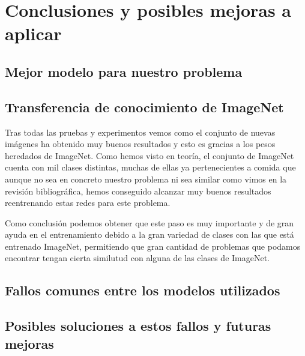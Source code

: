 \section{Conclusiones y posibles mejoras a aplicar}

\subsection{Mejor modelo para nuestro problema}


\subsection{Transferencia de conocimiento de ImageNet}

Tras todas las pruebas y experimentos vemos como el conjunto de nuevas imágenes ha obtenido muy buenos resultados y esto es gracias a los pesos heredados de ImageNet. Como hemos visto en teoría, el conjunto de ImageNet cuenta con mil clases distintas, muchas de ellas ya pertenecientes a comida que aunque no sea en concreto nuestro problema ni sea similar como vimos en la revisión bibliográfica, hemos conseguido alcanzar muy buenos resultados reentrenando estas redes para este problema.

Como conclusión podemos obtener que este paso es muy importante y de gran ayuda en el entrenamiento debido a la gran variedad de clases con las que está entrenado ImageNet, permitiendo que gran cantidad de problemas que podamos encontrar tengan cierta similutud con alguna de las clases de ImageNet.


\subsection{Fallos comunes entre los modelos utilizados}

\subsection{Posibles soluciones a estos fallos y futuras mejoras}
